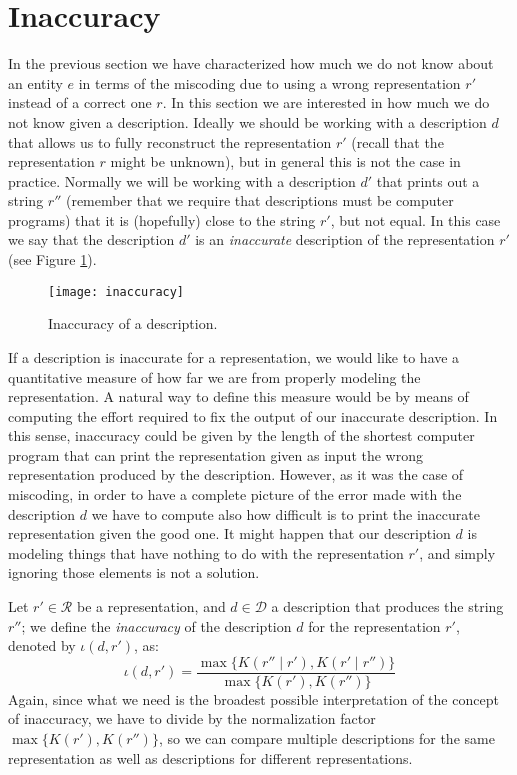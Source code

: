 %
%

\section{Inaccuracy}
\label{sec:introduction:inaccuracy}

In the previous section we have characterized how much we do not know about an entity $e$ in terms of the miscoding due to using a wrong representation $r'$ instead of a correct one $r$. In this section we are interested in how much we do not know given a description. Ideally we should be working with a description $d$ that allows us to fully reconstruct the representation $r'$ (recall that the representation $r$ might be unknown), but in general this is not the case in practice. Normally we will be working with a description $d'$ that prints out a string $r''$ (remember that we require that descriptions must be computer programs) that it is (hopefully) close to the string $r'$, but not equal. In this case we say that the description $d'$ is an \emph{inaccurate} description of the representation $r'$ (see Figure \ref{fig:inaccuracy:inaccuracy:inaccuracy}).

\begin{figure}[h]
\centering\texttt{[image: inaccuracy]}
\caption{\label{fig:inaccuracy:inaccuracy:inaccuracy}Inaccuracy of a description.}
\end{figure}

If a description is inaccurate for a representation, we would like to have a quantitative measure of how far we are from properly modeling the representation. A natural way to define this measure would be by means of computing the effort required to fix the output of our inaccurate description. In this sense, inaccuracy could be given by the length of the shortest computer program that can print the representation given as input the wrong representation produced by the description. However, as it was the case of miscoding, in order to have a complete picture of the error made with the description $d$ we have to compute also how difficult is to print the inaccurate representation given the good one. It might happen that our description $d$ is modeling things that have nothing to do with the representation $r'$, and simply ignoring those elements is not a solution.

Let $r' \in \mathcal{R}$ be a representation, and $d \in \mathcal{D}$ a description that produces the string $r''$; we define the \emph{inaccuracy} of the description $d$ for the representation $r'$, denoted by $\iota(d, r')$, as:
\[
\iota(d, r') = \frac{ \max\{ K(r'' \mid r'), K(r' \mid r'') \} } { \max\{ K(r'), K(r'') \} }
\]
Again, since what we need is the broadest possible interpretation of the concept of inaccuracy, we have to divide by the normalization factor $\max\{ K(r'), K(r'') \}$, so we can compare multiple descriptions for the same representation as well as descriptions for different representations.

